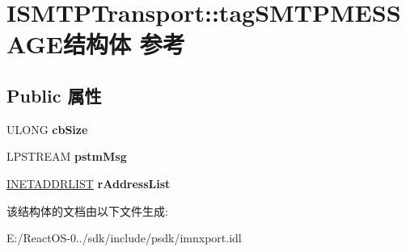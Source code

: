 \hypertarget{struct_i_s_m_t_p_transport_1_1tag_s_m_t_p_m_e_s_s_a_g_e}{}\section{I\+S\+M\+T\+P\+Transport\+:\+:tag\+S\+M\+T\+P\+M\+E\+S\+S\+A\+G\+E结构体 参考}
\label{struct_i_s_m_t_p_transport_1_1tag_s_m_t_p_m_e_s_s_a_g_e}
\subsection*{Public 属性}
\begin{DoxyCompactItemize}
\item 
\mbox{\label{struct_i_s_m_t_p_transport_1_1tag_s_m_t_p_m_e_s_s_a_g_e_a2926e206615464d6680b3a81a5f083b2}} 
U\+L\+O\+NG {\bfseries cb\+Size}
\item 
\mbox{\label{struct_i_s_m_t_p_transport_1_1tag_s_m_t_p_m_e_s_s_a_g_e_a9ecbfda8f7a090ef553e0261be4a5c20}} 
L\+P\+S\+T\+R\+E\+AM {\bfseries pstm\+Msg}
\item 
\mbox{\label{struct_i_s_m_t_p_transport_1_1tag_s_m_t_p_m_e_s_s_a_g_e_ace084b3eb39aca3860980ae4685deea7}} 
\hyperlink{structtag_i_n_e_t_a_d_d_r_l_i_s_t}{I\+N\+E\+T\+A\+D\+D\+R\+L\+I\+ST} {\bfseries r\+Address\+List}
\end{DoxyCompactItemize}


该结构体的文档由以下文件生成\+:\begin{DoxyCompactItemize}
\item 
E\+:/\+React\+O\+S-\/0../sdk/include/psdk/imnxport.\+idl\end{DoxyCompactItemize}
